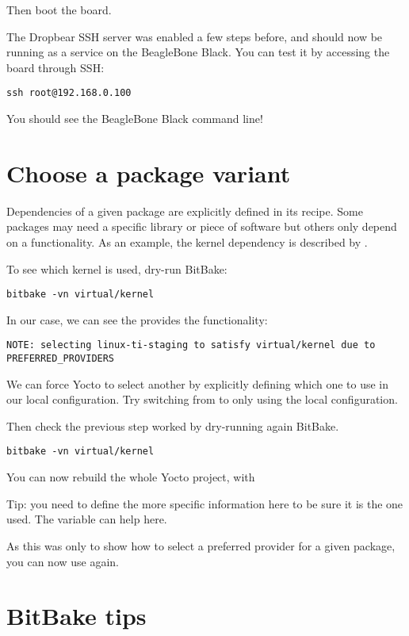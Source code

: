 Then boot the board.

The Dropbear SSH server was enabled a few steps before, and should now be
running as a service on the BeagleBone Black. You can test it by accessing the
board through SSH:
\begin{verbatim}
ssh root@192.168.0.100
\end{verbatim}

You should see the BeagleBone Black command line!

\section{Choose a package variant}

Dependencies of a given package are explicitly defined in its recipe.
Some packages may need a specific library or piece of software but
others only depend on a functionality. As an example, the kernel
dependency is described by .

To see which kernel is used, dry-run BitBake:
\begin{verbatim}
bitbake -vn virtual/kernel
\end{verbatim}

In our case, we can see the  provides the
 functionality:
\small
\begin{verbatim}
NOTE: selecting linux-ti-staging to satisfy virtual/kernel due to PREFERRED_PROVIDERS
\end{verbatim}
\normalsize

We can force Yocto to select another  by explicitly
defining which one to use in our local configuration. Try switching
from  to  only using the
local configuration.

Then check the previous step worked by dry-running again BitBake.
\begin{verbatim}
bitbake -vn virtual/kernel
\end{verbatim}

You can now rebuild the whole Yocto project, with 

Tip: you need to define the more specific information here to be sure it is the
one used. The  variable can help here.

As this was only to show how to select a preferred provider for a
given package, you can now use  again.

\section{BitBake tips}

